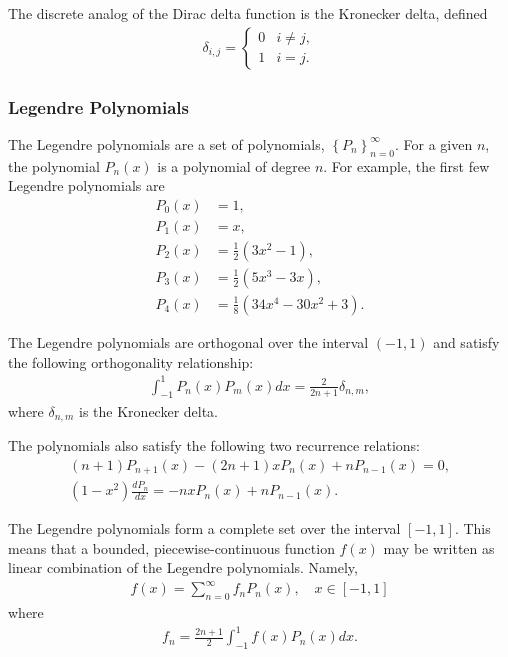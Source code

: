 \documentclass[11pt]{article}
\begin{document}
The discrete analog of the Dirac delta function is the Kronecker delta, defined
\begin{align}
  \delta_{i,j} = 
  \begin{cases}
    0 & i \neq j, \\
    1 & i = j.
  \end{cases}
\end{align}
\subsubsection{Legendre Polynomials}
\label{sec:orgheadline40}
The Legendre polynomials are a set of polynomials, \(\left\{ P_n \right\}_{n=0}^\infty\).  For a given \(n\), the polynomial \(P_n(x)\) is a polynomial of degree \(n\).  For example, the first few Legendre polynomials are
\begin{align*}
  P_0(x) &= 1, \\
  P_1(x) &= x, \\
  P_2(x) &= \frac{1}{2}\left(3 x^2 - 1 \right), \\
  P_3(x) &= \frac{1}{2}\left(5 x^3 - 3 x \right), \\
  P_4(x) &= \frac{1}{8}\left(34 x^4 - 30 x^2 + 3 \right).
\end{align*}

The Legendre polynomials are orthogonal over the interval \((-1, 1)\) and satisfy the following orthogonality relationship:
\begin{align}
  \int_{-1}^1 P_n(x) P_m(x) dx = \frac{2}{2n+1} \delta_{n,m},
\end{align}
where \(\delta_{n,m}\) is the Kronecker delta.

The polynomials also satisfy the following two recurrence relations:
\begin{align}
  (n+1) P_{n+1}(x) - (2n + 1) x P_n(x) + n P_{n-1}(x) = 0, \\
  \left(1 - x^2\right) \frac{dP_n}{dx} = -n x P_n(x) + n P_{n-1}(x).
\end{align}

The Legendre polynomials form a complete set over the interval \([-1, 1]\).  This means that a bounded, piecewise-continuous function \(f(x)\) may be written as linear combination of the Legendre polynomials.  Namely,
\begin{align}
  f(x) = \sum_{n=0}^\infty f_n P_n(x), \quad x \in [-1,1]
\end{align}
where
\begin{align}
  f_n = \frac{2n+1}{2} \int_{-1}^{1} f(x) P_n(x) dx.
\end{align}
\end{document}

